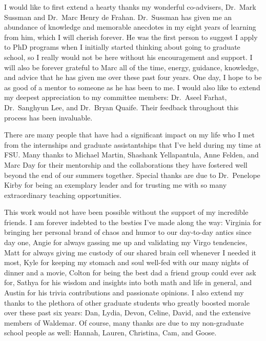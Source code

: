 \documentclass[11pt,expanded,copyright]{fsuthesis}
\begin{document}
\begin{acknowledgments}
I would like to first extend a hearty thanks my wonderful co-advisers, Dr.\ Mark Sussman and Dr.\ Marc Henry de Frahan. Dr.\ Sussman has given me an abundance of knowledge and memorable anecdotes in my eight years of learning from him, which I will cherish forever. He was the first person to suggest I apply to PhD programs when I initially started thinking about going to graduate school, so I really would not be here without his encouragement and support. I will also be forever grateful to Marc all of the time, energy, guidance, knowledge, and advice that he has given me over these past four years. One day, I hope to be as good of a mentor to someone as he has been to me. I would also like to extend my deepest appreciation to my committee members: Dr.\ Aseel Farhat, Dr.\ Sanghyun Lee, and Dr.\ Bryan Quaife. Their feedback throughout this process has been invaluable. 

There are many people that have had a significant impact on my life who I met from the internships and graduate assistantships that I've held during my time at FSU. Many thanks to Michael Martin, Shashank Yellapantula, Anne Felden, and Marc Day for their mentorship and the collaborations they have fostered well beyond the end of our summers together. Special thanks are due to Dr.\ Penelope Kirby for being an exemplary leader and for trusting me with so many extraordinary teaching opportunities.  

This work would not have been possible without the support of my incredible friends. I am forever indebted to the besties I've made along the way: Virginia for bringing her personal brand of chaos and humor to our day-to-day antics since day one, Angie for always gassing me up and validating my Virgo tendencies, Matt for always giving me custody of our shared brain cell whenever I needed it most, Kyle for keeping my stomach and soul well-fed with our many nights of dinner and a movie, Colton for being the best dad a friend group could ever ask for, Sathya for his wisdom and insights into both math and life in general, and Austin for his trivia contributions and passionate opinions. I also extend my thanks to the plethora of other graduate students who greatly boosted morale over these past six years: Dan, Lydia, Devon, Celine, David, and the extensive members of Waldemar. Of course, many thanks are due to my non-graduate school people as well: Hannah, Lauren, Christina, Cam, and Goose. 


\end{acknowledgments}
\end{document}
